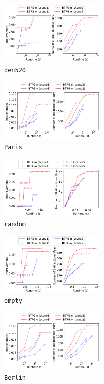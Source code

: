 \documentclass[letterpaper]{article} %
\theoremstyle{definition}
\begin{document}
\begin{figure}[h]
    \centering
    \includegraphics[width=0.45\textwidth]{Figs/anytime_den520.png}
    \caption{\texttt{den520}}
\end{figure}
\begin{figure}[h]
    \centering
    \includegraphics[width=0.45\textwidth]{Figs/anytime_paris.png}
    \caption{\texttt{Paris}}
\end{figure}
\begin{figure}[h]
    \centering
    \includegraphics[width=0.45\textwidth]{Figs/anytime_random.png}
    \caption{\texttt{random}}
\end{figure}
\begin{figure}[h]
    \centering
    \includegraphics[width=0.45\textwidth]{Figs/anytime_empty.png}
    \caption{\texttt{empty}}
\end{figure}
\begin{figure}[h]
    \centering
    \includegraphics[width=0.45\textwidth]{Figs/anytime_berlin.png}
    \caption{\texttt{Berlin}}
\end{figure}
\end{document}
